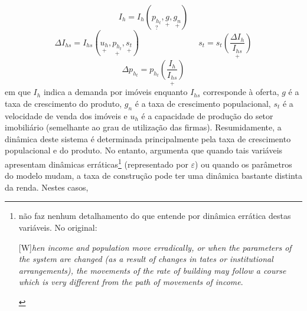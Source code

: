 \begin{equation}
\label{Demanda_Ih}
I_{h} = I_h(\underset{?}{p_{h_t}}, \underset{+}{g}, \underset{+}{g_n})
\end{equation}
\begin{equation}
\label{Oferta_Ih}
\Delta I_{hs} =  I_{hs}(\underset{+}{u_h}, \underset{+}{p_{h_t}}, \underset{+}{s_t}) \hspace{3cm} s_t = s_t\underset{+}{\left(\frac{\Delta I_h}{I_{hs}}\right)}
\end{equation}
\begin{equation}
\label{Precos_Ih}
\Delta p_{h_t} = p_{h_t}\underset{+}{\left(\frac{I_{h}}{I_{hs}}\right)}
\end{equation}
em que $I_h$ indica a demanda por imóveis enquanto $I_{hs}$ corresponde à oferta, $g$ é a taxa de crescimento do produto, $g_n$ é a taxa de crescimento populacional, $s_t$ é a velocidade de venda dos imóveis e
$u_h$ é a capacidade de produção do setor imobiliário (semelhante ao grau de utilização das firmas).
Resumidamente, a dinâmica deste sistema é determinada principalmente pela taxa de crescimento populacional e do produto. No entanto, \textcite{duesenberry_investment_1958} argumenta que quando tais variáveis apresentam dinâmicas erráticas\footnote{\textcite[p.~158]{duesenberry_investment_1958} não faz nenhum detalhamento do que entende por dinâmica errática destas variáveis. No original:

\begin{citacao}

[W]\textit{hen income and population move erradically, or when the parameters of the system are changed (as a result of changes in tates or institutional arrangements), the movements of the rate of building may follow a course which is very different from the path of movements of income}.
\end{citacao}

} (representado por $\varepsilon$) ou quando os parâmetros do modelo mudam, a taxa de construção pode ter uma dinâmica bastante distinta da renda. Nestes casos,

